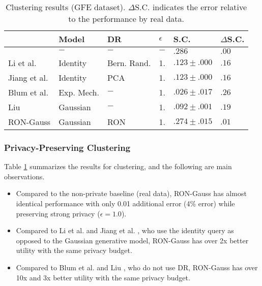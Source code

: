 \documentclass[USenglish,oneside,twocolumn]{article}
\providecommand{\tabularnewline}{\\}
\theoremstyle{definition}
\theoremstyle{remark}
\theoremstyle{plain}
\theoremstyle{plain}
\begin{document}
\begin{table}
\begin{centering}
\begin{tabular}{>{\centering}p{1.7cm}>{\centering}p{1.1cm}>{\centering}p{1cm}>{\centering}p{0.25cm}>{\centering}p{1.3cm}>{\centering}p{0.9cm}}
\toprule 
{Method }  & {Model }  & {DR}  & {$\epsilon$}  & {S.C.}  & {$\Delta$S.C.}\tabularnewline
\midrule
\midrule 
{Real data }  & {$-$ }  & {$-$ }  & {$-$ }  & {$.286$}  & {$.00$}\tabularnewline
\midrule 
{Li et al. \cite{RefWorks:337} }  & {Identity }  & {Bern. Rand. }  & {1.}  & {$.123\pm.000$}  & {$.16$}\tabularnewline
\midrule 
{Jiang et al. \cite{RefWorks:339} }  & {Identity }  & {PCA }  & {1.}  & {$.123\pm.000$}  & {$.16$}\tabularnewline
\midrule 
{Blum et al. \cite{RefWorks:174} }  & {Exp. Mech. }  & {$-$ }  & {1.}  & {$.026\pm.017$}  & {$.26$}\tabularnewline
\midrule 
{Liu \cite{RefWorks:372} }  & {Gaussian }  & {$-$ }  & {1.}  & {$.092\pm.001$}  & {$.19$}\tabularnewline
\midrule 
{RON-Gauss }  & {Gaussian }  & {RON }  & {1.}  & {$.274\pm.015$}  & {$.01$}\tabularnewline
\bottomrule
\end{tabular}
\par\end{centering}
\caption{Clustering results (GFE dataset). $\Delta$S.C.
indicates the error relative to the performance by real data. \label{tab:Clustering-results}}
\vspace{-1em}
\end{table}

\vspace{-1.5em}
\subsubsection{Privacy-Preserving Clustering}
\vspace{-1em}
Table \ref{tab:Clustering-results} summarizes the results for clustering,
and the following are main observations. 
\begin{itemize}
\item Compared to the non-private baseline (real data), RON-Gauss has almost
identical performance with only 0.01 additional error (4\% error)
while preserving strong privacy ($\epsilon=1.0$). 
\item Compared to Li et al. \cite{RefWorks:337} and Jiang et al. \cite{RefWorks:339},
who use the identity query as opposed to the Gaussian generative model,
RON-Gauss has over 2x better utility with the same privacy budget. 
\item Compared to Blum et al. \cite{RefWorks:174} and Liu \cite{RefWorks:372},
who do not use DR, RON-Gauss has over 10x and 3x better utility with
the same privacy budget. 
\end{itemize}
\end{document}
